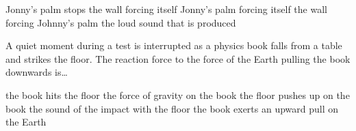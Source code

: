 \documentclass[answers]{exam}
\begin{document}
\begin{questions}
\begin{randomizechoices}
    \choice Jonny's palm stops
    \choice the wall forcing itself
    \choice Jonny's palm forcing itself
    \correctchoice the wall forcing Johnny's palm
    \choice the loud sound that is produced
\end{randomizechoices}

\question
A quiet moment during a test is interrupted as a physics book falls from a table and strikes the floor.  The reaction force to the force of the Earth pulling the book downwards is\dots 

\begin{randomizechoices}
    \choice the book hits the floor
    \choice the force of gravity on the book
    \choice the floor pushes up on the book
    \choice the sound of the impact with the floor
    \correctchoice the book exerts an upward pull on the Earth
\end{randomizechoices}

\end{questions}

\clearpage
\end{document}
